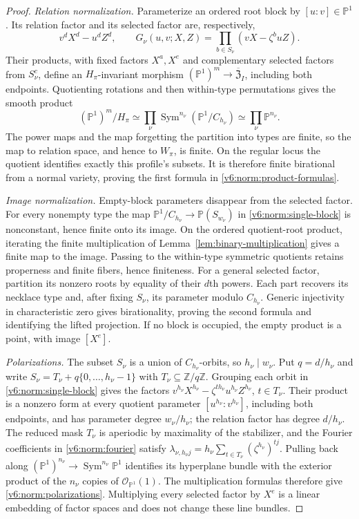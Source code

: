 \documentclass[10pt,fleqn]{article}
\numberwithin{equation}{section}
\newcommand{\PP}{\mathbb P}
\begin{document}
\begin{proof}
\emph{Relation normalization.}
Parameterize an ordered root block by $[u:v]\in\PP^1$.  Its relation
factor and its selected factor are, respectively,
\begin{equation}\label{v6:norm:single-block}
 v^dX^d-u^dZ^d,
 \qquad
 G_\nu(u,v;X,Z)=\prod_{b\in S_\nu}(vX-\zeta^b uZ).
\end{equation}
Their products, with fixed factors $X^a,X^e$ and complementary
selected factors from $S_\nu^c$, define an $H_\pi$-invariant
morphism $(\PP^1)^m\to\overline{\mathfrak Z}_I$, including
both endpoints.  Quotienting rotations and then within-type
permutations gives the smooth product
\[
 (\PP^1)^m/H_\pi
 \simeq\prod_\nu
       \operatorname{Sym}^{n_\nu}(\PP^1/C_{h_\nu})
 \simeq\prod_\nu\PP^{n_\nu}.
\]
The power maps and the map forgetting the partition into types are
finite, so the map to relation space, and hence to $W_\pi$, is finite.
On the regular locus the quotient identifies exactly this profile's
subsets.  It is therefore finite birational from a normal variety,
proving the first formula in \eqref{v6:norm:product-formulas}.

\emph{Image normalization.}
Empty-block parameters disappear from the selected factor.  For every
nonempty type the map
$\PP^1/C_{h_\nu}\to\PP(S_{w_\nu})$ in
\eqref{v6:norm:single-block} is nonconstant, hence finite onto its image.
On the ordered quotient-root product, iterating the finite
multiplication of Lemma~\ref{lem:binary-multiplication} gives a finite
map to the image.  Passing to the within-type symmetric quotients
retains properness and finite fibers, hence finiteness.
For a general selected factor, partition its nonzero roots by
equality of their $d$th powers.  Each part recovers its necklace
type and, after fixing $S_\nu$, its parameter modulo $C_{h_\nu}$.
Generic injectivity in characteristic zero gives birationality,
proving the second formula
and identifying the lifted projection.  If no block is occupied,
the empty product is a point, with image $[X^e]$.

\emph{Polarizations.}
The subset $S_\nu$ is a union of $C_{h_\nu}$-orbits, so
$h_\nu\mid w_\nu$.  Put $q=d/h_\nu$ and write
$S_\nu=T_\nu+q\{0,\ldots,h_\nu-1\}$ with
$T_\nu\subseteq\mathbb Z/q\mathbb Z$.  Grouping each orbit in
\eqref{v6:norm:single-block} gives the factors
$v^{h_\nu}X^{h_\nu}-\zeta^{t h_\nu}u^{h_\nu}Z^{h_\nu}$,
$t\in T_\nu$.  Their product is a nonzero form at every quotient parameter
$[u^{h_\nu}:v^{h_\nu}]$, including both endpoints, and has parameter
degree $w_\nu/h_\nu$; the relation factor has degree $d/h_\nu$.
The reduced mask $T_\nu$ is aperiodic by maximality of the stabilizer,
and the Fourier coefficients in \eqref{v6:norm:fourier} satisfy
$\lambda_{\nu,h_\nu j}=h_\nu\sum_{t\in T_\nu}(\zeta^{h_\nu})^{tj}$.  Pulling back along
$(\PP^1)^{n_\nu}\longrightarrow\operatorname{Sym}^{n_\nu}\PP^1$
identifies its hyperplane bundle with the exterior product of the
$n_\nu$ copies of $\mathcal O_{\PP^1}(1)$.  The multiplication
formulas therefore give \eqref{v6:norm:polarizations}.  Multiplying
every selected factor by $X^e$ is a linear embedding of factor
spaces and does not change these line bundles.
\end{proof}
\end{document}
